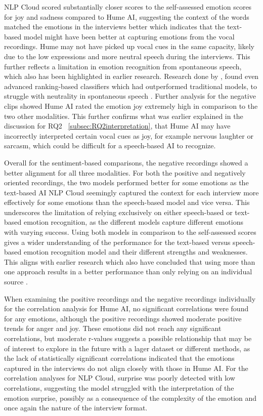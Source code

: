 NLP Cloud scored substantially closer scores to the self-assessed emotion scores for joy and sadness compared to Hume AI, suggesting the context of the words matched the emotions in the interviews better which indicates that the text-based model might have been better at capturing emotions from the vocal recordings. Hume may not have picked up vocal cues in the same capacity, likely due to the low expressions and more neutral speech during the interviews. This further reflects a limitation in emotion recognition from spontaneous speech, which also has been highlighted in earlier research. Research done by \textcite{Cao2015}, found even advanced ranking-based classifiers which had outperformed traditional models, to struggle with neutrality in spontaneous speech \autocite{Cao2015}.
Further analysis for the negative clips showed Hume AI rated the emotion joy extremely high in comparison to the two other modalities. This further confirms what was earlier explained in the discussion for RQ2 ~\ref{subsec:RQ2interpretation}, that Hume AI may have incorrectly interpreted certain vocal cues as joy, for example nervous laughter or sarcasm, which could be difficult for a speech-based AI to recognize.

Overall for the sentiment-based comparisons, the negative recordings showed a better alignment for all three modalities. For both the positive and negatively oriented recordings, the two models performed better for some emotions as the text-based AI NLP Cloud seemingly captured the context for each interview more effectively for some emotions than the speech-based model and vice versa. This underscores the limitation of relying exclusively on either speech-based or text-based emotion recognition, as the different models capture different emotions with varying success. Using both models in comparison to the self-assessed scores gives a wider understanding of the performance for the text-based versus speech-based emotion recognition model and their different strengths and weaknesses. This aligns with earlier research which also have concluded that using more than one approach results in a better performance than only relying on an individual source \autocite{Cao2015}.

When examining the positive recordings and the negative recordings individually for the correlation analysis for Hume AI, no significant correlations were found for any emotions, although the positive recordings showed moderate positive trends for anger and joy. These emotions did not reach any significant correlations, but moderate r-values suggests a possible relationship that may be of interest to explore in the future with a lager dataset or different methods, as the lack of statistically significant correlations indicated that the emotions captured in the interviews do not align closely with those in Hume AI. 
For the correlation analyses for NLP Cloud, surprise was poorly detected with low correlations, suggesting the model struggled with the interpretation of the emotion surprise, possibly as a consequence of the complexity of the emotion and once again the nature of the interview format.

